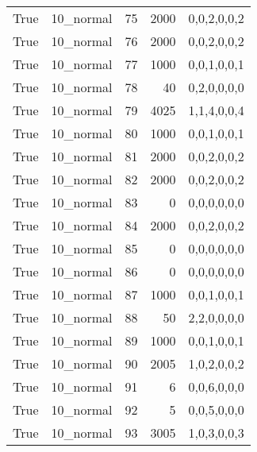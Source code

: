 \begin{tabular}{llrrl}
 True            & 10\_normal           &            75 &                  2000 & 0,0,2,0,0,2   \\
 True            & 10\_normal           &            76 &                  2000 & 0,0,2,0,0,2   \\
 True            & 10\_normal           &            77 &                  1000 & 0,0,1,0,0,1   \\
 True            & 10\_normal           &            78 &                    40 & 0,2,0,0,0,0   \\
 True            & 10\_normal           &            79 &                  4025 & 1,1,4,0,0,4   \\
 True            & 10\_normal           &            80 &                  1000 & 0,0,1,0,0,1   \\
 True            & 10\_normal           &            81 &                  2000 & 0,0,2,0,0,2   \\
 True            & 10\_normal           &            82 &                  2000 & 0,0,2,0,0,2   \\
 True            & 10\_normal           &            83 &                     0 & 0,0,0,0,0,0   \\
 True            & 10\_normal           &            84 &                  2000 & 0,0,2,0,0,2   \\
 True            & 10\_normal           &            85 &                     0 & 0,0,0,0,0,0   \\
 True            & 10\_normal           &            86 &                     0 & 0,0,0,0,0,0   \\
 True            & 10\_normal           &            87 &                  1000 & 0,0,1,0,0,1   \\
 True            & 10\_normal           &            88 &                    50 & 2,2,0,0,0,0   \\
 True            & 10\_normal           &            89 &                  1000 & 0,0,1,0,0,1   \\
 True            & 10\_normal           &            90 &                  2005 & 1,0,2,0,0,2   \\
 True            & 10\_normal           &            91 &                     6 & 0,0,6,0,0,0   \\
 True            & 10\_normal           &            92 &                     5 & 0,0,5,0,0,0   \\
 True            & 10\_normal           &            93 &                  3005 & 1,0,3,0,0,3   \\

\end{tabular}
